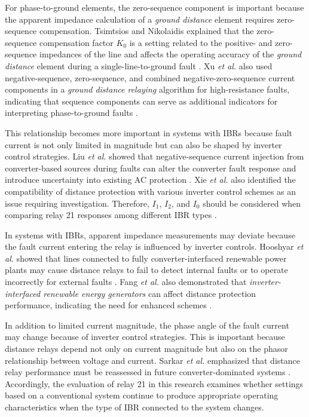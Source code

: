 For phase-to-ground elements, the zero-sequence component is important because the apparent impedance calculation of a \textit{ground distance} element requires zero-sequence compensation. Tsimtsios and Nikolaidis explained that the zero-sequence compensation factor \(K_0\) is a setting related to the positive- and zero-sequence impedances of the line and affects the operating accuracy of the \textit{ground distance} element during a single-line-to-ground fault \cite{tsimtsios2018setting}. Xu \textit{et al.} also used negative-sequence, zero-sequence, and combined negative-zero-sequence current components in a \textit{ground distance relaying} algorithm for high-resistance faults, indicating that sequence components can serve as additional indicators for interpreting phase-to-ground faults \cite{xu2010ground}.

This relationship becomes more important in systems with IBRs because fault current is not only limited in magnitude but can also be shaped by inverter control strategies. Liu \textit{et al.} showed that negative-sequence current injection from converter-based sources during faults can alter the converter fault response and introduce uncertainty into existing AC protection \cite{liu2025impact}. Xie \textit{et al.} also identified the compatibility of distance protection with various inverter control schemes as an issue requiring investigation. Therefore, \(I_1\), \(I_2\), and \(I_0\) should be considered when comparing relay 21 responses among different IBR types \cite{xie2025distance}.

In systems with IBRs, apparent impedance measurements may deviate because the fault current entering the relay is influenced by inverter controls. Hooshyar \textit{et al.} showed that lines connected to fully converter-interfaced renewable power plants may cause distance relays to fail to detect internal faults or to operate incorrectly for external faults \cite{hooshyar2015cirepp1}. Fang \textit{et al.} also demonstrated that \textit{inverter-interfaced renewable energy generators} can affect distance protection performance, indicating the need for enhanced schemes \cite{fang2019impact}.

In addition to limited current magnitude, the phase angle of the fault current may change because of inverter control strategies. This is important because distance relays depend not only on current magnitude but also on the phasor relationship between voltage and current. Sarkar \textit{et al.} emphasized that distance relay performance must be reassessed in future converter-dominated systems \cite{sarkar2017distance_relay_future}. Accordingly, the evaluation of relay 21 in this research examines whether settings based on a conventional system continue to produce appropriate operating characteristics when the type of IBR connected to the system changes.

